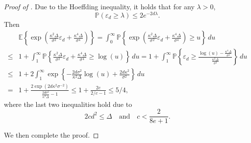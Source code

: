 \documentclass[twoside]{article}
\begin{document}
\begin{proof}[Proof of ]
Due to the Hoeffding inequality, it holds that for any $\lambda > 0$,
	\[
		\mathbb{P}(\varepsilon_d \geq \lambda) \leq 2e^{-2d\lambda}.
	\]	
	Then
	\begin{align*}
		& \mathbb{E} \left\{\exp\left(\frac{\kappa^2 \Delta}{\sigma^2} \varepsilon_d + \frac{\kappa^4 \Delta}{\sigma^4}\right)\right\}	= \int_0^{\infty} \mathbb{P}\left\{\exp\left(\frac{\kappa^2 \Delta}{\sigma^2} \varepsilon_d + \frac{\kappa^4 \Delta}{\sigma^4}\right) \geq u\right\} \, du \\
		\leq & 1 + \int_1^{\infty} \mathbb{P}\left\{\frac{\kappa^2 \Delta}{\sigma^2} \varepsilon_d + \frac{\kappa^4 \Delta}{\sigma^4} \geq \log(u)\right\} \, du = 1 + \int_1^{\infty} \mathbb{P}\left\{\varepsilon_d \geq \frac{\log(u) - \frac{\kappa^4 \Delta}{\sigma^4}}{\frac{\kappa^2 \Delta}{\sigma^2}}\right\} \, du \\
		\leq & 1 + 2\int_1^{\infty} \exp\left\{-\frac{2d\sigma^2}{\kappa^2 \Delta} \log(u) + \frac{2d\kappa^2}{\sigma^2}\right\} \, du \\
		= & 1 + \frac{2\exp(2d\kappa^2\sigma^{-2})}{\frac{2d\sigma^2}{\kappa^2 \Delta} - 1} \leq 1 + \frac{2e}{2/c-1} \leq 5/4,
	\end{align*}
	where the last two inequalities hold due to
	\[
		2cd^2 \leq \Delta \quad \mbox{and} \quad	 c < \frac{2}{8e+1}.
	\]

We then complete the proof.
	
\end{proof}


	
\end{document}
